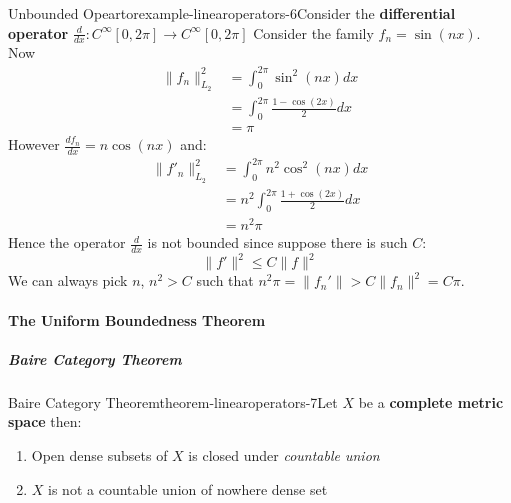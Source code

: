 \begin{mystthmexample}{Unbounded Opeartor}{example-linearoperators-6}Consider the \textbf{differential operator} $\frac{d}{dx}: C^{\infty}[0,2\pi]\to C^{\infty}[0,2\pi]$
Consider the family $f_n=\sin(nx)$. Now
\begin{equation}
\begin{aligned}
\|f_n\|^2_{L_2} &=\int_0^{2\pi}\sin^2(nx)dx \\
&=\int_0^{2\pi}\frac{1-\cos(2x)}{2}dx \\
&=\pi
\end{aligned}
\end{equation}
However $\frac{df_n}{dx}=n\cos(nx)$ and:
\begin{equation}
\begin{aligned}
\|f'_n\|^2_{L_2}&= \int_0^{2\pi} n^2\cos^2(nx)dx \\
&=n^2\int_0^{2\pi}\frac{1+\cos(2x)}{2} dx \\
&= n^2\pi
\end{aligned}
\end{equation}
Hence the operator $\frac{d}{dx}$ is not bounded since suppose there is such $C$:
\begin{equation}
\|f'\|^2 \leq C\|f\|^2
\end{equation}
We can always pick $n$, $n^2 >C$ such that $n^2\pi =\|f_n'\|>C\|f_n\|^2=C\pi$.

\end{mystthmexample}
\paragraph{The Uniform Boundedness Theorem}

\subparagraph{Baire Category Theorem}

\begin{mystthmtheorem}{Baire Category Theorem}{theorem-linearoperators-7}Let $X$ be a \textbf{complete metric space} then:

\begin{enumerate}
\item Open dense subsets of $X$ is closed under \textit{countable union}
\item $X$ is not a countable union of nowhere dense set
\end{enumerate}

\end{mystthmtheorem}